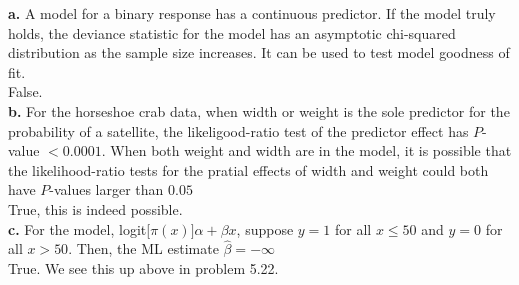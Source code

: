 \documentclass[paper=letter, fontsize=11pt]{scrartcl} %
\begin{document}
\textbf{a.} A model for a binary response has a continuous predictor. If the model truly
holds, the deviance statistic for the model has an asymptotic chi-squared distribution
as the sample size increases. It can be used to test model goodness of fit.
\\

False.
\\

\textbf{b.} For the horseshoe crab data, when width or weight is the sole predictor for
the probability of a satellite, the likeligood-ratio test of the predictor effect has
$P$-value $< 0.0001$. When both weight and width are in the model, it is possible that
the likelihood-ratio tests for the pratial effects of width and weight could both have
$P$-values larger than $0.05$
\\

True, this is indeed possible.
\\

\textbf{c.} For the model, logit[$\pi(x)] \alpha + \beta x$, suppose $y = 1$ for all
$x \le 50$ and $y = 0$ for all $x > 50$. Then, the ML estimate $\hat{\beta} = -\infty$
\\

True. We see this up above in problem 5.22.
\end{document}
